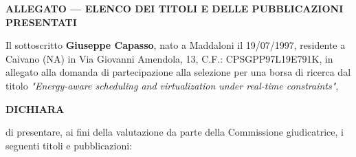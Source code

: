 \documentclass[11pt,a4paper]{article}
\begin{document}
\pagestyle{empty}

\begin{center}
    {\large \textbf{ALLEGATO --- ELENCO DEI TITOLI E DELLE PUBBLICAZIONI PRESENTATI}}
\end{center}

\vspace{4mm}

Il sottoscritto \textbf{Giuseppe Capasso}, nato a Maddaloni il 19/07/1997, residente a Caivano (NA) in Via Giovanni Amendola, 13, C.F.: CPSGPP97L19E791K, in allegato alla domanda di partecipazione alla selezione per una borsa di ricerca dal titolo \textit{"Energy-aware scheduling and virtualization under real-time constraints"},

\begin{center}
    \textbf{DICHIARA}
\end{center}

di presentare, ai fini della valutazione da parte della Commissione giudicatrice, i seguenti titoli e pubblicazioni:
\end{document}
